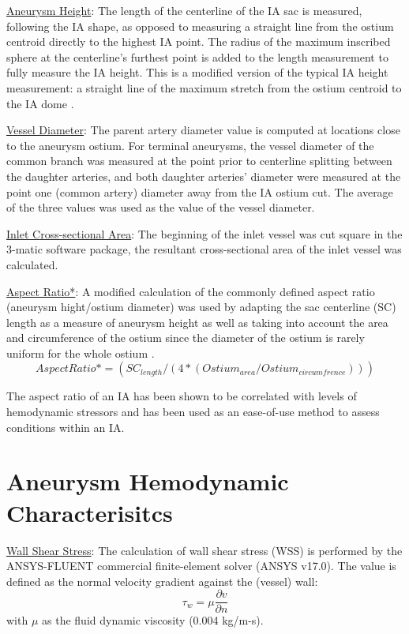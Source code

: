 \underline{Aneurysm Height}: The length of the centerline of the IA sac is measured, following the IA shape, as opposed to measuring a straight line from the ostium centroid directly to the highest IA point. The radius of the maximum inscribed sphere at the centerline's furthest point is added to the length measurement to fully measure the IA height. This is a modified version of the typical IA height measurement: a straight line of the maximum stretch from the ostium centroid to the IA dome \cite{ma2010size,duan2018morphological}. 

\underline{Vessel Diameter}: The parent artery diameter value is computed at locations close to the aneurysm ostium. For terminal aneurysms, the vessel diameter of the common branch was measured at the point prior to centerline splitting between the daughter arteries, and both daughter arteries' diameter were measured at the point one (common artery) diameter away from the IA ostium cut. The average of the three values was used as the value of the vessel diameter.

\underline{Inlet Cross-sectional Area}: The beginning of the inlet vessel was cut square in the 3-matic software package, the resultant cross-sectional area of the inlet vessel was calculated. 
 
\underline{Aspect Ratio*}: A modified calculation of the commonly defined aspect ratio (aneurysm hight/ostium diameter) was used by adapting the sac centerline (SC) length as a measure of aneurysm height as well as taking into account the area and circumference of the ostium since the diameter of the ostium is rarely uniform for the whole ostium \cite{piccinelli2012characterization}.
\begin{equation}
Aspect Ratio* = (SC_{length} / (4*(Ostium_{area} / Ostium_{circumfrence})))
\end{equation}

The aspect ratio of an IA has been shown to be correlated with levels of hemodynamic stressors and has been used as an ease-of-use method to assess conditions within an IA.  

\section{Aneurysm Hemodynamic Characterisitcs}\label{CHAPTER1_SECTION3}


\underline{Wall Shear Stress}: 
The calculation of wall shear stress (WSS) is performed by the ANSYS-FLUENT commercial finite-element solver (ANSYS v17.0). The value is defined as the normal velocity gradient against the (vessel) wall:
\begin{equation} \label{WSS}
\tau_w = \mu\frac{\partial v}{\partial n}
\end{equation}
with $\mu$ as the fluid dynamic viscosity (0.004 kg/m-s). 

